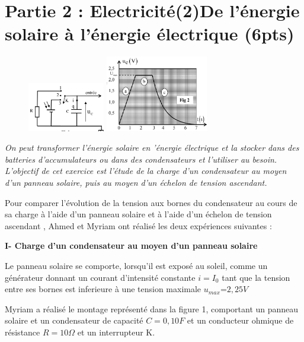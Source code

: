 \documentclass[12pt]{article}
\begin{document}
\section*{Partie 2 : Electricité(2)De l’énergie solaire à l’énergie électrique  \dotfill(6pts) }

\begin{figure}
  \begin{center}
    
\includegraphics[width=0.3\textwidth]{./img/circuit00.png} 
\includegraphics[width=0.4\textwidth]{./img/courbe00.png} 

  \end{center}
\end{figure}


\emph{On peut transformer l’énergie solaire en ’énergie électrique et la stocker dans des batteries
d’accumulateurs ou dans des condensateurs et l’utiliser au besoin.
L’objectif de cet exercice est l’étude de la charge d’un condensateur au moyen d’un panneau
solaire, puis au moyen d’un échelon de tension ascendant.}

Pour comparer l’évolution de la tension aux bornes du condensateur au cours de sa charge à l’aide d’un
panneau solaire et à l’aide d’un échelon de tension ascendant , Ahmed et Myriam ont réalisé les deux
expériences suivantes :



\textbf{I- Charge d’un condensateur au moyen d’un panneau solaire}

Le panneau solaire se comporte, lorsqu’il est exposé au soleil,
comme un générateur donnant un courant d’intensité
constante $i = I_0$ tant que la tension entre ses bornes est inferieure 
à une tension maximale $u_{max} $=$2,25V$

Myriam a réalisé le montage représenté dans la figure 1,
comportant un panneau solaire et un condensateur de capacité $C=0,10F$
et un conducteur ohmique de résistance $R=10\Omega$
et un interrupteur K.
\end{document}
